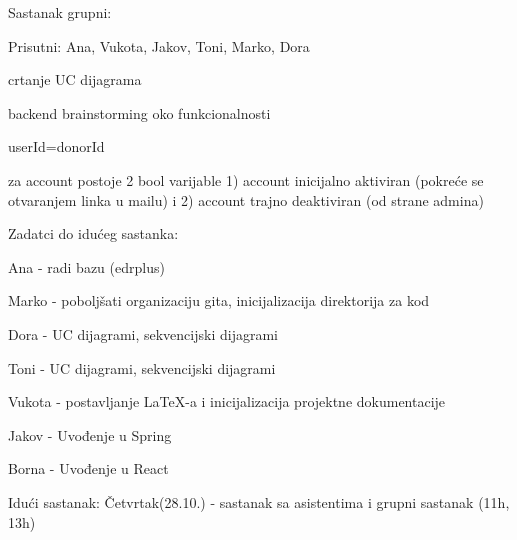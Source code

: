 \begin{packed_enum}
\begin{packed_item}
		        \item Sastanak grupni:
		        \item[] \begin{packed_item}
		            \item Prisutni: Ana, Vukota, Jakov, Toni, Marko, Dora
		            \item crtanje UC dijagrama
		            \item backend brainstorming oko funkcionalnosti
		            \item userId=donorId
		            \item za account postoje 2 bool varijable 1) account inicijalno aktiviran (pokreće se otvaranjem linka u mailu) i 2) account trajno deaktiviran (od strane admina) 
	            \end{packed_item}
	            
	            \item Zadatci do idućeg sastanka:
	            \item[] \begin{packed_item}
	               \item Ana - radi bazu (edrplus)
	               \item Marko - poboljšati organizaciju gita, inicijalizacija direktorija za kod
	               \item Dora - UC dijagrami, sekvencijski dijagrami
	               \item Toni - UC dijagrami, sekvencijski dijagrami
	               \item Vukota - postavljanje LaTeX-a i inicijalizacija projektne dokumentacije
	               \item Jakov - Uvođenje u Spring
	               \item Borna - Uvođenje u React
	            \end{packed_item}
	            \item Idući sastanak: Četvrtak(28.10.) - sastanak sa asistentima i grupni sastanak (11h, 13h)
	        \end{packed_item}
	        

\end{packed_enum}
